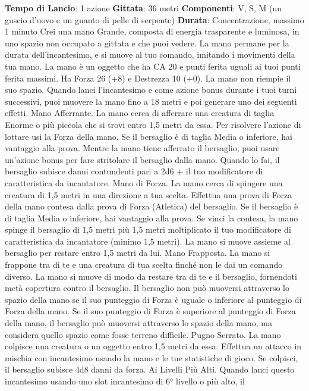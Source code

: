 \begin{multicols}{2}
\textbf{Tempo di Lancio}: 1 azione
\textbf{Gittata}: 36 metri
\textbf{Componenti}: V, S, M (un guscio d’uovo e un guanto di
pelle di serpente)
\textbf{Durata}: Concentrazione, massimo 1 minuto
Crei una mano Grande, composta di energia
trasparente e luminosa, in uno spazio non occupato a
gittata e che puoi vedere. La mano permane per la
durata dell’incantesimo, e si muove al tuo comando,
imitando i movimenti della tua mano.
La mano è un oggetto che ha CA 20 e punti ferita uguali
ai tuoi punti ferita massimi. Ha Forza 26 (+8) e
Destrezza 10 (+0). La mano non riempie il suo spazio.
Quando lanci l’incantesimo e come azione bonus
durante i tuoi turni successivi, puoi muovere la mano
fino a 18 metri e poi generare uno dei seguenti effetti.
Mano Afferrante. La mano cerca di afferrare una
creatura di taglia Enorme o più piccola che si trovi entro 
1,5 metri da essa. Per risolvere l’azione di lottare usi la
Forza della mano. Se il bersaglio è di taglia Media o
inferiore, hai vantaggio alla prova. Mentre la mano tiene
afferrato il bersaglio, puoi usare un’azione bonus per
fare stritolare il bersaglio dalla mano. Quando lo fai, il
bersaglio subisce danni contundenti pari a 2d6 + il tuo
modificatore di caratteristica da incantatore.
Mano di Forza. La mano cerca di spingere una
creatura di 1,5 metri in una direzione a tua scelta.
Effettua una prova di Forza della mano contesa dalla
prova di Forza (Atletica) del bersaglio. Se il bersaglio è
di taglia Media o inferiore, hai vantaggio alla prova. Se
vinci la contesa, la mano spinge il bersaglio di 1,5 metri
più 1,5 metri moltiplicato il tuo modificatore di
caratteristica da incantatore (minimo 1,5 metri). La
mano si muove assieme al bersaglio per restare entro
1,5 metri da lui.
Mano Frapposta. La mano si frappone tra di te e una
creatura di tua scelta finché non le dai un comando
diverso. La mano si muove di modo da restare tra di te
e il bersaglio, fornendoti metà copertura contro il
bersaglio. Il bersaglio non può muoversi attraverso lo
spazio della mano se il suo punteggio di Forza è uguale
o inferiore al punteggio di Forza della mano. Se il suo
punteggio di Forza è superiore al punteggio di Forza
della mano, il bersaglio può muoversi attraverso lo
spazio della mano, ma considera quello spazio come
fosse terreno difficile.
Pugno Serrato. La mano colpisce una creatura o un
oggetto entro 1,5 metri da essa. Effettua un attacco in
mischia con incantesimo usando la mano e le tue
statistiche di gioco. Se colpisci, il bersaglio subisce 4d8
danni da forza.
Ai Livelli Più Alti. Quando lanci questo incantesimo
usando uno slot incantesimo di 6° livello o più alto, il

\end{multicols}
